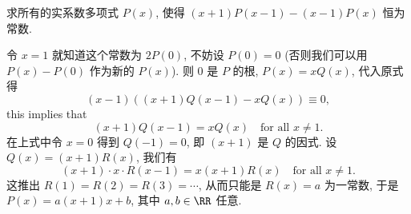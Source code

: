 \begin{prob}
\label{prob:prob-13}
求所有的实系数多项式 $P(x)$,
使得 $(x + 1)P(x - 1) - (x - 1)P(x)$ 恒为常数.
\end{prob}

\begin{soln}
令 $x = 1$ 就知道这个常数为 $2P(0)$, 不妨设 $P(0) = 0$
(否则我们可以用 $P(x) - P(0)$ 作为新的 $P(x)$).
则 $0$ 是 $P$ 的根, $P(x) = xQ(x)$, 代入原式得
\[
(x - 1)((x + 1)Q(x - 1) - xQ(x)) \equiv 0,
\]
this implies that
\[
(x + 1)Q(x - 1) = xQ(x) \quad \text{for all $x \ne 1$}.
\]
在上式中令 $x = 0$ 得到 $Q(-1) = 0$, 即 $(x + 1)$ 是 $Q$ 的因式.
设 $Q(x) = (x + 1)R(x)$, 我们有
\[
(x + 1)\cdot x \cdot R(x - 1) = x(x + 1)R(x) \quad \text{for all $x \ne 1$}.
\]
这推出 $R(1) = R(2) = R(3) = \cdots$,
从而只能是 $R(x) = a$ 为一常数, 于是 $P(x) = a(x + 1)x + b$,
其中 $a, b \in \RR$ 任意.
\end{soln}
